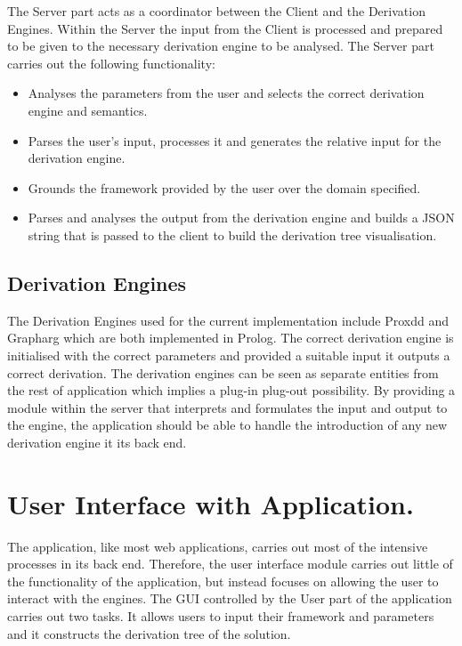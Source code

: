 The Server part acts as a coordinator between the Client and the Derivation Engines. Within the Server the input from the Client is processed and prepared to be given to the necessary derivation engine to be analysed. The Server part carries out the following functionality:

\begin{itemize}

\item Analyses the parameters from the user and selects the correct derivation engine and semantics.
\item Parses the user's input, processes it and generates the relative input for the derivation engine.
\item Grounds the framework provided by the user over the domain specified.
\item Parses and analyses the output from the derivation engine and builds a JSON string that is passed to the client to build the derivation tree visualisation.

\end{itemize}

\subsection{Derivation Engines}

The Derivation Engines used for the current implementation include Proxdd and Grapharg which are both implemented in Prolog. The correct derivation engine is initialised with the correct parameters and provided a suitable input it outputs a correct derivation. The derivation engines can be seen as separate entities from the rest of application which implies a plug-in plug-out possibility. By providing a module within the server that interprets and formulates the input and output to the engine, the application should be able to handle the introduction of any new derivation engine it its back end.

\section{User Interface with Application.}

The application, like most web applications, carries out most of the intensive processes in its back end. Therefore, the user interface module carries out little of the functionality of the application, but instead focuses on allowing the user to interact with the engines. The GUI controlled by the User part of the application carries out two tasks. It allows users to input their framework and parameters and it constructs the derivation tree of the solution.

